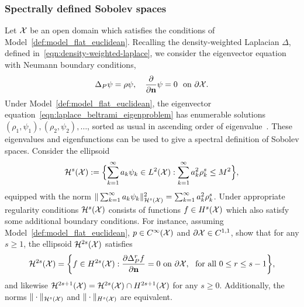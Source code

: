 \subsubsection{Spectrally defined Sobolev spaces}
Let $\mathcal{X}$ be an open domain which satisfies the conditions of Model~\ref{def:model_flat_euclidean}. Recalling the density-weighted Laplacian $\Delta$, defined in~\eqref{eqn:density-weighted-laplace}, we consider the eigenvector equation with Neumann boundary conditions,
\begin{equation}
\label{eqn:laplace_beltrami_eigenproblem}
\Delta_P\psi = \rho \psi, \quad \frac{\partial}{\partial{\bf n}}\psi = 0~~\textrm{on $\partial \mathcal{X}$.}
\end{equation}
Under Model~\ref{def:model_flat_euclidean}, the eigenvector equation~\eqref{eqn:laplace_beltrami_eigenproblem} has enumerable solutions $(\rho_1,\psi_1),(\rho_2,\psi_2),\ldots$, sorted as usual in ascending order of eigenvalue~\citep{garciatrillos18}. These eigenvalues and eigenfunctions can be used to give a spectral definition of Sobolev spaces. Consider the ellipsoid
\begin{equation}
\label{eqn:sobolev_ellipsoid}
\mathcal{H}^{s}(\mathcal{X}) := \Bigl\{\sum_{k = 1}^{\infty} a_k \psi_k \in L^2(\mathcal{X}):  \sum_{k = 1}^{\infty} a_k^2 \rho_k^s \leq M^2 \Bigr\},
\end{equation}
equipped with the norm $\|\sum_{k = 1}^{\infty} a_k \psi_k\|_{\mathcal{H}^s(\mathcal{X})}^2 = \sum_{k = 1}^{\infty} a_k^2 \rho_k^s$. Under appropriate regularity conditions $\mathcal{H}^s(\mathcal{X})$ consists of functions $f \in H^s(\mathcal{X})$ which also satisfy some additional boundary conditions. For instance, assuming Model~\ref{def:model_flat_euclidean}, $p \in C^{\infty}(\mathcal{X})$ and $\partial \mathcal{X} \in C^{1,1}$, \citet{dunlop2020} show that for any $s \geq 1$, the ellipsoid $\mathcal{H}^{2s}(\mathcal{X})$ satisfies
\begin{equation}
\label{eqn:sobolev_ellipsoid_to_sobolev_ball}
\mathcal{H}^{2s}(\mathcal{X}) = 
\biggl\{f \in H^{2s}(\mathcal{X}): \frac{\partial \Delta_P^rf}{\partial {\bf n}} = 0~\textrm{on}~\partial\mathcal{X},~~\textrm{for all $0 \leq r \leq s - 1$} \biggr\},
\end{equation}
and likewise $\mathcal{H}^{2s + 1}(\mathcal{X}) = \mathcal{H}^{2s}(\mathcal{X}) \cap H^{2s + 1}(\mathcal{X})$ for any $s \geq 0$. Additionally, the norms $\|\cdot\|_{\mathcal{H}^s(\mathcal{X})}$ and $\|\cdot\|_{H^s(\mathcal{X})}$ are equivalent.


